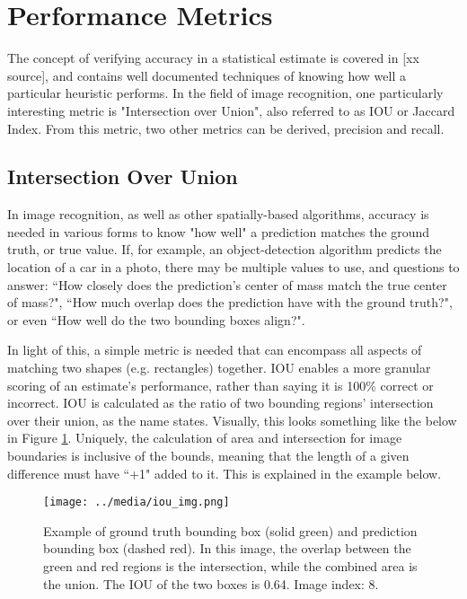 
\section{Performance Metrics}
The concept of verifying accuracy in a statistical estimate is covered in [xx source], and contains well documented techniques of knowing how well a particular heuristic performs. In the field of image recognition, one particularly interesting metric is "Intersection over Union", also referred to as IOU or Jaccard Index. From this metric, two other metrics can be derived, precision and recall. 

\subsection{Intersection Over Union}
In image recognition, as well as other spatially-based algorithms, accuracy is needed in various forms to know "how well" a prediction matches the ground truth, or true value. If, for example, an object-detection algorithm predicts the location of a car in a photo, there may be multiple values to use, and questions to answer: ``How closely does the prediction's center of mass match the true center of mass?", ``How much overlap does the prediction have with the ground truth?", or even ``How well do the two bounding boxes align?". 

In light of this, a simple metric is needed that can encompass all aspects of matching two shapes (e.g. rectangles) together. IOU enables a more granular scoring of an estimate's performance, rather than saying it is 100\% correct or incorrect. IOU is calculated as the ratio of two bounding regions' intersection over their union, as the name states. Visually, this looks something like the below in Figure \ref{iou_img}. Uniquely, the calculation of area and intersection for image boundaries is inclusive of the bounds, meaning that the length of a given difference must have ``+1" added to it. This is explained in the example below.

\begin{figure}[ht] %
    \texttt{[image: ../media/iou\_img.png]}
    \caption{Example of ground truth bounding box (solid green) and prediction bounding box (dashed red). In this image, the overlap between the green and red regions is the intersection, while the combined area is the union. The IOU of the two boxes is 0.64. Image index: 8.}
    \label{iou_img} %
\end{figure}

